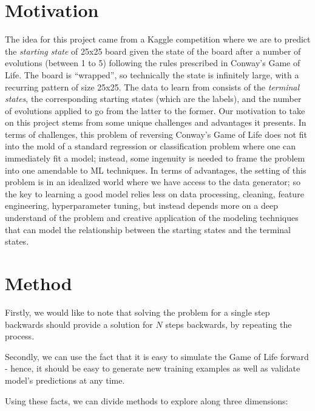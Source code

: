 \documentclass[conference]{IEEEtran}
\begin{document}
\section{Motivation}
The idea for this project came from a Kaggle competition \cite{b1} where we are to predict the {\it starting state} of 25x25 board given the state of the board after a number of evolutions (between 1 to 5) following the rules prescribed in Conway's Game of Life. The board is ``wrapped'', so technically the state is infinitely large, with a recurring pattern of size 25x25. The data to learn from consists of the {\it terminal states}, the corresponding starting states (which are the labels), and the number of evolutions applied to go from the latter to the former. Our motivation to take on this project stems from some unique challenges and advantages it presents. In terms of challenges, this problem of reversing Conway's Game of Life does not fit into the mold of a standard regression or classification problem where one can immediately fit a model; instead, some ingenuity is needed to frame the problem into one amendable to ML techniques. In terms of advantages, the setting of this problem is in an idealized world where we have access to the data generator; so the key to learning a good model relies less on data processing, cleaning, feature engineering, hyperparameter tuning, but instead depends more on a deep understand of the problem and creative application of the modeling techniques that can model the relationship between the starting states and the terminal states. 

\section{Method}

Firstly, we would like to note that solving the problem for a single step backwards should provide a solution for $N$ steps backwards, by repeating the process.

Secondly, we can use the fact that it is easy to simulate the Game of Life forward - hence, it should be easy to generate new training examples as well as validate model's predictions at any time.

Using these facts, we can divide methods to explore along three dimensions:
\end{document}
